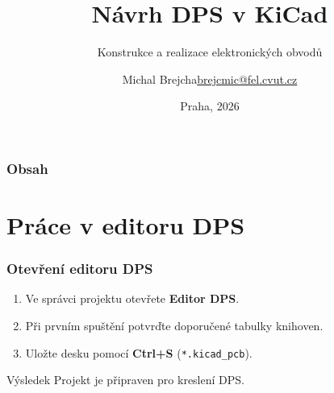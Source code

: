 \documentclass{beamer}
\title[KiCad PCB Editor]{Návrh DPS v KiCad}
\subtitle[KEO]{\texorpdfstring{Konstrukce a realizace elektronických obvodů}{Konstrukce a realizace elektronickych obvodu}}
\author[Brejcha]{\texorpdfstring{Michal Brejcha\newline\url{brejcmic@fel.cvut.cz}}{Michal Brejcha}}
\institute[ČVUT]{ČVUT v Praze, FEL}
\date[Praha, 2026]{Praha, 2026}
\begin{document}
\frame{\titlepage}

\begin{frame}
\frametitle{Obsah} 
\tableofcontents
\end{frame}


\section{\texorpdfstring{Práce v editoru DPS}{Prace v editoru DPS}}
\begin{frame}
	\frametitle{Otevření editoru DPS}
	\begin{enumerate}
		\item Ve správci projektu otevřete \textbf{Editor DPS}.
		\item Při prvním spuštění potvrďte doporučené tabulky knihoven.
		\item Uložte desku pomocí \textbf{Ctrl+S} (\texttt{*.kicad\_pcb}).
	\end{enumerate}

	\vfill
	\begin{block}{Výsledek}
		Projekt je připraven pro kreslení DPS.
	\end{block}

\end{frame}

\end{document}
